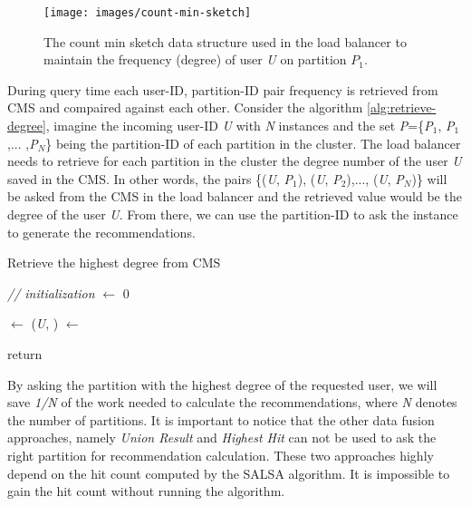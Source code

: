 \begin{figure}[!h]
    \centering
    \texttt{[image: images/count-min-sketch]}
    \caption{The count min sketch data structure used in the load balancer to maintain the frequency (degree) of user \emph{U} on partition \emph{$P_1$}.}
    \label{fig:count-min-sketch}
\end{figure}


During query time each user-ID, partition-ID pair frequency is retrieved from CMS and compaired against each other. Consider the algorithm \ref{alg:retrieve-degree}, imagine the incoming user-ID \emph{U} with \emph{N} instances and the set \emph{P}=\{\emph{P$_1$}, \emph{P$_1$},... ,\emph{P$_N$}\} being the partition-ID of each partition in the cluster. The load balancer needs to retrieve for each partition in the cluster the degree number of the user \emph{U} saved in the CMS. In other words, the pairs \{(\emph{U}, \emph{P$_1$}), (\emph{U}, \emph{P$_2$}),..., (\emph{U}, \emph{P$_N$})\} will be asked from the CMS in the load balancer and the retrieved value would be the degree of the user \emph{U}. From there, we can use the partition-ID to ask the instance to generate the recommendations.


\begin{algorithm}[H]
    \caption{Retrieve the highest degree from CMS}
    \label{alg:retrieve-degree}




    \SetAlgoLined

    \BlankLine\emph{// initialization}\BlankLine
    \degree $\leftarrow$ 0 \;

    \BlankLine
    {
        \tuple $\leftarrow$ (\emph{U}, \partitionId)\;
        \count $\leftarrow$ \;
        \If{ \count $>$ \degree}{
                \degree $\leftarrow$ \count \;
                \partitionToAsk $\leftarrow$ $\partitionId$
            }
    }

    return \partitionToAsk \;

    \BlankLine
\end{algorithm}


By asking the partition with the highest degree of the requested user, we will save \emph{1/N} of the work needed to calculate the recommendations, where \emph{N} denotes the number of partitions. It is important to notice that the other data fusion approaches, namely \emph{Union Result} and \emph{Highest Hit} can not be used to ask the right partition for recommendation calculation. These two approaches highly depend on the hit count computed by the SALSA algorithm. It is impossible to gain the hit count without running the algorithm.

